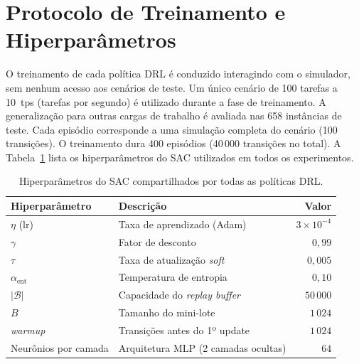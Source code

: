 \section*{Protocolo de Treinamento e Hiperparâmetros}

O treinamento de cada política \gls{DRL} é conduzido interagindo com o simulador, sem nenhum acesso aos cenários de teste. Um único cenário de 100 tarefas a 10~tps (tarefas por segundo) é utilizado durante a fase de treinamento. A generalização para outras cargas de trabalho é avaliada nas 658 instâncias de teste. Cada episódio corresponde a uma simulação completa do cenário (100 transições). O treinamento dura 400 episódios (40\,000 transições no total). A Tabela~\ref{tab:sac-hparams} lista os hiperparâmetros do \gls{SAC} utilizados em todos os experimentos.


\begin{table}[htb]
\centering
\caption{Hiperparâmetros do \gls{SAC} compartilhados por todas as políticas \gls{DRL}.}
\label{tab:sac-hparams}
\begin{tabular}{llr}
\toprule
\textbf{Hiperparâmetro} & \textbf{Descrição} & \textbf{Valor} \\
\midrule
$\eta$ (lr)             & Taxa de aprendizado (Adam)         & $3 \times 10^{-4}$ \\
$\gamma$                & Fator de desconto                  & $0{,}99$           \\
$\tau$                  & Taxa de atualização \textit{soft}  & $0{,}005$          \\
$\alpha_{\text{ent}}$   & Temperatura de entropia            & $0{,}10$           \\
$|\mathcal{B}|$         & Capacidade do \textit{replay buffer} & $50\,000$        \\
$B$                     & Tamanho do mini-lote               & $1\,024$           \\
\textit{warmup}         & Transições antes do 1º update      & $1\,024$           \\
Neurônios por camada    & Arquitetura \gls{MLP} (2 camadas ocultas)& $64$               \\
\bottomrule
\end{tabular}
\end{table}

